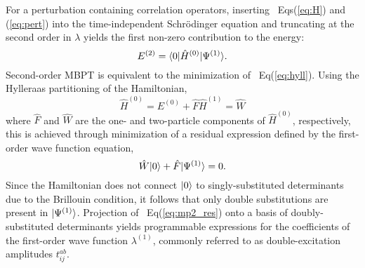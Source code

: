 For a perturbation containing correlation operators, 
inserting ~Eqs(\ref{eq:H}) and (\ref{eq:pert}) into the time-independent Schr\"odinger equation and truncating at the 
second order in $\lambda$ yields the first non-zero contribution to the energy:
\begin{equation} \label{eq:hyll}
    E^{(2)} = \langle0 |\hat{H}^{(0)}| \Psi^{(1)} \rangle.
\end{equation}
Second-order MBPT is equivalent to the minimization of ~Eq(\ref{eq:hyll}). 
Using the Hylleraas partitioning of the Hamiltonian,
\begin{subequations}
    \begin{equation}
        \hat{H}^{(0)} = E^{(0)} + \hat{F}
    \end{equation}
    \begin{equation}
        \hat{H}^{(1)} = \hat{W}
    \end{equation}
\end{subequations}
where $\hat{F}$ and $\hat{W}$ are the one- and two-particle components of $\hat{H}^{(0)}$, respectively, 
this is achieved through minimization of a residual expression defined by the first-order wave 
function equation,
\begin{equation} \label{eq:mp2_res}
    \hat{W}| 0 \rangle + \hat{F}| \Psi^{(1)} \rangle = 0.
\end{equation}
Since the Hamiltonian does not connect $| 0 \rangle$ to singly-substituted determinants due to the Brillouin condition, it follows that only double substitutions are present in $| \Psi^{(1)} \rangle$. 
Projection of ~Eq(\ref{eq:mp2_res}) onto a basis of doubly-substituted determinants yields programmable expressions for the coefficients of the first-order wave function $\lambda^{(1)}$, 
commonly referred to as double-excitation amplitudes $t^{ab}_{ij}$. 

